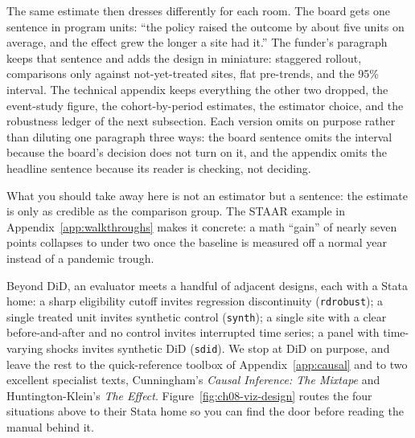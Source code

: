 The same estimate then dresses differently for each room. The board gets one sentence in program units: \enquote{the policy raised the outcome by about five units on average, and the effect grew the longer a site had it.} The funder's paragraph keeps that sentence and adds the design in miniature: staggered rollout, comparisons only against not-yet-treated sites, flat pre-trends, and the 95\% interval. The technical appendix keeps everything the other two dropped, the event-study figure, the cohort-by-period estimates, the estimator choice, and the robustness ledger of the next subsection. Each version omits on purpose rather than diluting one paragraph three ways: the board sentence omits the interval because the board's decision does not turn on it, and the appendix omits the headline sentence because its reader is checking, not deciding.

What you should take away here is not an estimator but a sentence: the estimate is only as credible as the comparison group. The STAAR example in Appendix~\ref{app:walkthroughs} makes it concrete: a math \enquote{gain} of nearly seven points collapses to under two once the baseline is measured off a normal year instead of a pandemic trough.

Beyond DiD, an evaluator meets a handful of adjacent designs, each with a Stata home: a sharp eligibility cutoff invites regression discontinuity (\texttt{rdrobust}); a single treated unit invites synthetic control (\texttt{synth}); a single site with a clear before-and-after and no control invites interrupted time series; a panel with time-varying shocks invites synthetic DiD (\texttt{sdid}). We stop at DiD on purpose, and leave the rest to the quick-reference toolbox of Appendix~\ref{app:causal} and to two excellent specialist texts, Cunningham's \emph{Causal Inference: The Mixtape} and Huntington-Klein's \emph{The Effect}. Figure~\ref{fig:ch08-viz-design} routes the four situations above to their Stata home so you can find the door before reading the manual behind it.

